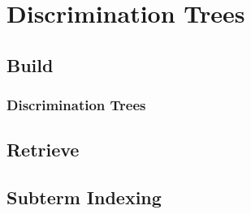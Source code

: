 
\section{Discrimination Trees}

\subsection{Build}
\begin{frame}
	\frametitle{Discrimination Trees}
	
\end{frame}

\subsection{Retrieve}
\begin{frame}
	
\end{frame}

\subsection{Subterm Indexing}
\begin{frame}
	
\end{frame}